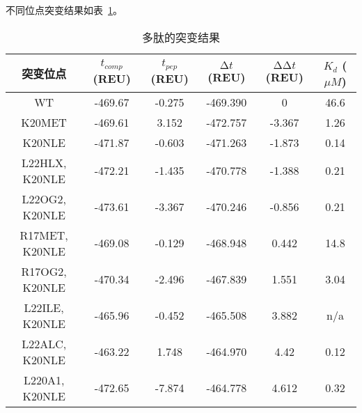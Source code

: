 不同位点突变结果如表~\ref{tab:mutate}。
\begin{table}
  \centering
  \begin{threeparttable}[c]
    \caption{多肽的突变结果}
    \label{tab:mutate}
    \begin{tabular}{cccccc}
      \toprule
      突变位点                & $t_{comp}$ (REU)    &  $t_{pep}$ (REU) & $\increment t$ (REU) & $\increment\increment t$ (REU) & $K_d$ ($\mu M$)\tnote{①} \\
      \midrule      
      WT                      & -469.67               & -0.275             & -469.390          & 0                       & 46.6                     \\     
      \rowcolor{red!20!green!40!}
      K20MET                  & -469.61               & 3.152              & -472.757          & -3.367                  & 1.26                     \\  
      \rowcolor{red!20!green!40!}
      K20NLE                  & -471.87               & -0.603             & -471.263          & -1.873                  & 0.14                     \\  
      \rowcolor{red!20!green!40!}
      L22HLX, K20NLE          & -472.21               & -1.435             & -470.778          & -1.388                  & 0.21                     \\          
      \rowcolor{red!20!green!40!}
      L22OG2, K20NLE          & -473.61               & -3.367             & -470.246          & -0.856                  & 0.21                     \\          
      R17MET, K20NLE          & -469.08               & -0.129             & -468.948          & 0.442                   & 14.8                     \\         
      R17OG2, K20NLE          & -470.34               & -2.496             & -467.839          & 1.551                   & 3.04                     \\         
      L22ILE, K20NLE          & -465.96               & -0.452             & -465.508          & 3.882                   & n/a                      \\        
      L22ALC, K20NLE\tnote{②} & -463.22               & 1.748              & -464.970          & 4.42                    & 0.12                     \\       
      L220A1, K20NLE          & -472.65               & -7.874             & -464.778          & 4.612                   & 0.32                     \\         

\end{tabular}
\end{threeparttable}
\end{table}
